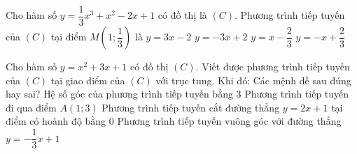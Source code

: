 

\begin{ex}%
	Cho hàm số $y=\dfrac{1}{3} x^3+x^2-2x+1$ có đồ thị là $\left(C\right)$. Phương  trình tiếp tuyến của $\left(C\right)$ tại điểm $M\left(1;\dfrac{1}{3}\right)$ là
	\choice 
		{$y=3x-2$} 
		{$y=-3x+2$} 
		 {\True $y=x-\dfrac{2}{3}$}
		{$y=-x+\dfrac{2}{3}$} 
\end{ex}



\begin{ex}%
 Cho hàm số $y=x^2+3 x+1$ có đồ thị $(C)$. Viết được phương trình tiếp tuyến của $(C)$ tại  giao điểm của $(C)$ với trục tung. Khi đó:
 Các mệnh  đề sau đúng hay sai?
  \choiceTF
  {\True Hệ số góc của phương trình tiếp tuyến bằng $ 3  $}
  {Phương trình tiếp  tuyến đi qua điểm $A(1; 3)$}
  {\True  Phương trình tiếp tuyến cắt đường thẳng $y=2 x+1$ tại điểm có hoành độ bằng $ 0 $}
  {\True Phương trình tiếp tuyến vuông góc với đường  thẳng $y=-\dfrac{1}{3} x+1$}
\end{ex}

